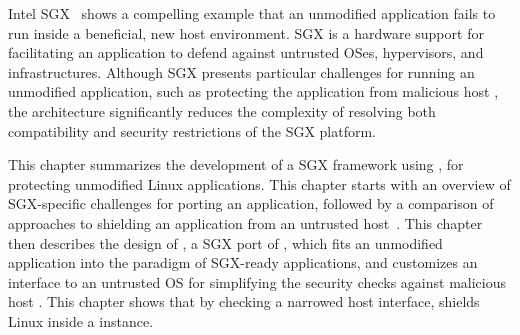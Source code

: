 Intel SGX~\cite{intelsgx} shows a compelling example that an unmodified application fails to run inside a beneficial, new host environment.
SGX is a hardware support
for facilitating an application to defend against untrusted OSes, hypervisors, and infrastructures.
Although SGX presents particular challenges for running an unmodified application, such as protecting the application
from malicious host \linuxapis{},
the \graphene{} architecture significantly reduces the complexity
of resolving both compatibility and security restrictions of the SGX platform.


This chapter summarizes the development of a SGX framework using \graphene{}, for protecting unmodified Linux applications.
This chapter starts with an overview of SGX-specific challenges
for porting an application,
followed by a comparison of approaches to shielding an application from an untrusted host~\cite{osdi16scone,shinde17panoply,baumann14haven}.
This chapter then describes the design of \graphenesgx{},
a SGX port of \graphene{},
which fits an unmodified application into the paradigm of SGX-ready applications,
and customizes an interface to an untrusted OS
for simplifying the security checks against malicious host \linuxapis{}.
This chapter shows
that by checking a narrowed host interface,
\graphenesgx{} shields Linux \linuxapis{} inside a \thelibos{} instance.
